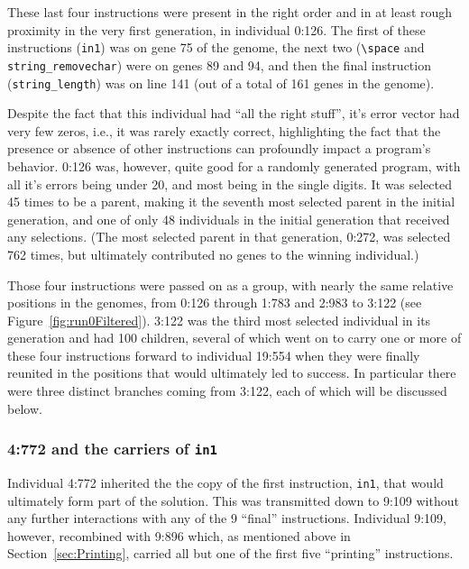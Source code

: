 These last four instructions were present in the right order and in at least
rough proximity in the very first generation, in individual 0:126. The first of these instructions (\texttt{in1}) was on gene 75 of the genome, the next two
(\texttt{\textbackslash space} and \texttt{string\_removechar}) were on 
genes 89 and 94, and then the final instruction (\texttt{string\_length}) 
was on line 141 (out of a total of 161 genes in the genome).

Despite the fact that this individual had ``all the right stuff'', it's error
vector had very few zeros, i.e., it was rarely exactly correct, highlighting
the fact that the presence or absence of other instructions can profoundly
impact a program's behavior. 0:126 was, however, quite good for a randomly
generated program, with all it's errors being under 20, and most being in
the single digits. It was selected 45 times to be a parent, making it the
seventh most selected parent in the initial generation, and one of only 48
individuals in the initial generation that received any selections. 
(The most selected
parent in that generation, 0:272, was selected 762 times, but ultimately
contributed no genes to the winning individual.)

Those four instructions were passed on as a group, with nearly the same 
relative positions in the genomes, from 0:126 through 1:783 and 2:983 
to 3:122 (see Figure~\ref{fig:run0Filtered}). 
3:122 was the third most selected individual in its generation
and had 100 children, several of which went on to carry one or more of
these four instructions forward to individual 19:554 when they were finally
reunited in the positions that would ultimately led to success. In particular
there were three distinct branches coming from 3:122, each of which will
be discussed below.

\subsubsection{4:772 and the carriers of \texttt{in1}}
\label{sec:4:772}


Individual 4:772 inherited the the copy of the first instruction,
\texttt{in1}, that would ultimately form part of the solution. This was
transmitted down to 9:109 without any further interactions with any of
the 9 ``final'' instructions. Individual 9:109, however, recombined with 
9:896 which, as mentioned above in Section~\ref{sec:Printing}, carried
all but one of the first five ``printing'' instructions. 

